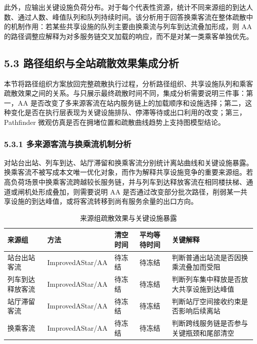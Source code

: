 \documentclass[UTF8,a4paper,12pt]{ctexart}
\begin{document}
此外，应输出关键设施负荷分布。对于每个代表性资源，统计不同来源组的到达人数、通过人数、峰值队列和队列持续时间。该分析用于回答换乘客流在整体疏散中的机制作用：若某些共享设施的队列主要由换乘流与列车到达流叠加形成，则 AA 的路径调整应解释为对多服务链交叉加载的响应，而不是对某一类乘客单独优先。

\subsection{5.3 路径组织与全站疏散效果集成分析}

本节将路径组织方案放回完整疏散执行过程，分析路径组织、共享设施队列和乘客疏散效果之间的关系。与只展示最终疏散时间不同，集成分析需要说明三件事：第一，AA 是否改变了多来源客流在站内服务链上的加载顺序和设施选择；第二，这种变化是否在执行层表现为关键设施排队、停滞等待或出口利用的改变；第三，Pathfinder 微观仿真是否在拥堵位置和疏散曲线趋势上支持图模型结论。

\subsubsection{5.3.1 多来源客流与换乘流机制分析}

对站台出站、列车到达、站厅滞留和换乘客流分别统计离站曲线和关键设施暴露。换乘客流不被写成本文唯一优化对象，而作为解释共享设施竞争的重要来源组。若高负荷场景中换乘客流跨越较长服务链，并与列车到达释放客流在相同楼扶梯、通道或闸机处形成叠加，则需要说明 AA 是否通过改变部分批次路径，削弱某一共享设施的到达峰值，或将客流转移到尚有服务余量的出口方向。

\begin{table}[htbp]
\centering
\caption{来源组疏散效果与关键设施暴露}
\small
\begin{tabular}{p{}p{}p{}p{}p{}}
\toprule
来源组 & 方法 & 清空时间 & 平均等待时间 & 关键解释 \\
\midrule
站台出站客流 & ImprovedAStar/AA & 待冻结 & 待冻结 & 判断普通出站流是否因换乘流叠加而受阻 \\
列车到达释放客流 & ImprovedAStar/AA & 待冻结 & 待冻结 & 判断列车集中释放是否放大共享设施到达峰值 \\
站厅滞留客流 & ImprovedAStar/AA & 待冻结 & 待冻结 & 判断站厅空间接收约束是否影响后续离站 \\
换乘客流 & ImprovedAStar/AA & 待冻结 & 待冻结 & 判断跨线服务链是否参与关键瓶颈和尾部清空 \\
\bottomrule
\end{tabular}
\end{table}
\end{document}

